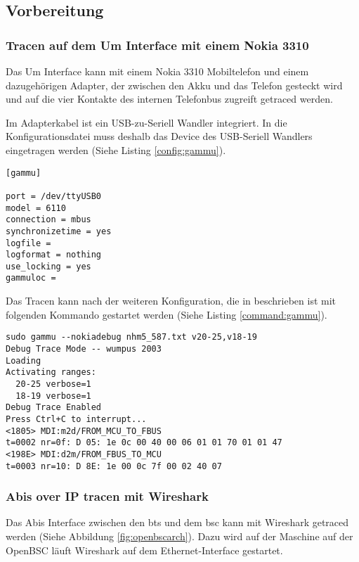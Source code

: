 \label{sec:analyse}

\subsection{Vorbereitung}
\subsubsection{Tracen auf dem Um Interface mit einem Nokia 3310}\label{sec:umtrace}
Das Um Interface kann mit einem Nokia 3310 Mobiltelefon und einem dazugehörigen Adapter, der zwischen den Akku und das Telefon gesteckt wird und auf die vier Kontakte des internen Telefonbus zugreift getraced werden.

Im Adapterkabel ist ein USB-zu-Seriell Wandler integriert. In die Konfigurationsdatei muss deshalb das Device des USB-Seriell Wandlers eingetragen werden (Siehe Listing \ref{config:gammu}).

\begin{lstlisting}[label=config:gammu,caption={Konfigurationsdatei für gammu und dem verwendeten Adapter}]
[gammu]

port = /dev/ttyUSB0
model = 6110
connection = mbus
synchronizetime = yes
logfile = 
logformat = nothing
use_locking = yes
gammuloc = 
\end{lstlisting}

Das Tracen kann nach der weiteren Konfiguration, die in \cite{bib:nokiagammu} beschrieben ist mit folgenden Kommando gestartet werden (Siehe Listing \ref{command:gammu}).

\begin{lstlisting}[label=command:gammu,caption={Aufruf von Gammu}]
sudo gammu --nokiadebug nhm5_587.txt v20-25,v18-19
Debug Trace Mode -- wumpus 2003
Loading
Activating ranges:
  20-25 verbose=1
  18-19 verbose=1
Debug Trace Enabled
Press Ctrl+C to interrupt...
<1805> MDI:m2d/FROM_MCU_TO_FBUS
t=0002 nr=0f: D 05: 1e 0c 00 40 00 06 01 01 70 01 01 47 
<198E> MDI:d2m/FROM_FBUS_TO_MCU
t=0003 nr=10: D 8E: 1e 00 0c 7f 00 02 40 07 
\end{lstlisting}

\subsubsection{Abis over IP tracen mit Wireshark}\label{sec:abistrace}
Das Abis Interface zwischen den \gls{bts} und dem \gls{bsc} kann mit Wireshark getraced werden (Siehe Abbildung \ref{fig:openbscarch}). Dazu wird auf der Maschine auf der OpenBSC läuft Wireshark auf dem Ethernet-Interface gestartet.

